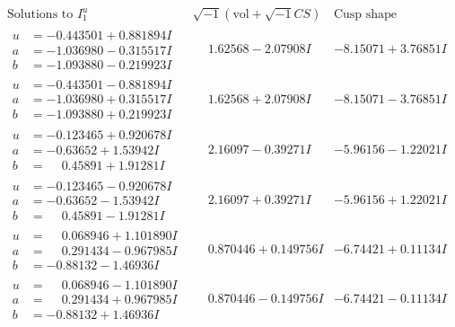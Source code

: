 \documentclass[1p]{elsarticle_modified}
\theoremstyle{definition}
\newcommand{\I}{\sqrt{-1}}
\begin{document}
$$\begin{array}{c|c|c}  
\text{Solutions to }I^u_{1}& \I (\text{vol} + \sqrt{-1}CS) & \text{Cusp shape}\\
 \hline 
\begin{aligned}
u &= -0.443501 + 0.881894 I \\
a &= -1.036980 - 0.315517 I \\
b &= -1.093880 - 0.219923 I\end{aligned}
 & \phantom{-}1.62568 - 2.07908 I & -8.15071 + 3.76851 I \\ \hline\begin{aligned}
u &= -0.443501 - 0.881894 I \\
a &= -1.036980 + 0.315517 I \\
b &= -1.093880 + 0.219923 I\end{aligned}
 & \phantom{-}1.62568 + 2.07908 I & -8.15071 - 3.76851 I \\ \hline\begin{aligned}
u &= -0.123465 + 0.920678 I \\
a &= -0.63652 + 1.53942 I \\
b &= \phantom{-}0.45891 + 1.91281 I\end{aligned}
 & \phantom{-}2.16097 - 0.39271 I & -5.96156 - 1.22021 I \\ \hline\begin{aligned}
u &= -0.123465 - 0.920678 I \\
a &= -0.63652 - 1.53942 I \\
b &= \phantom{-}0.45891 - 1.91281 I\end{aligned}
 & \phantom{-}2.16097 + 0.39271 I & -5.96156 + 1.22021 I \\ \hline\begin{aligned}
u &= \phantom{-}0.068946 + 1.101890 I \\
a &= \phantom{-}0.291434 - 0.967985 I \\
b &= -0.88132 - 1.46936 I\end{aligned}
 & \phantom{-}0.870446 + 0.149756 I & -6.74421 + 0.11134 I \\ \hline\begin{aligned}
u &= \phantom{-}0.068946 - 1.101890 I \\
a &= \phantom{-}0.291434 + 0.967985 I \\
b &= -0.88132 + 1.46936 I\end{aligned}
 & \phantom{-}0.870446 - 0.149756 I & -6.74421 - 0.11134 I \\ \hline\begin{aligned}

\end{aligned}
\end{array}$$
\end{document}
